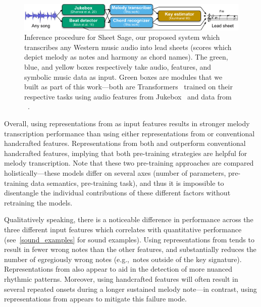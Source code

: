 \begin{figure}
    \centering
    \includegraphics[width=\linewidth]{figs/sheetsage.pdf}
    \caption{
    Inference procedure for Sheet Sage, our proposed system which transcribes any Western music audio into lead sheets (scores which depict melody as notes and harmony as chord names). The green, blue, and yellow boxes respectively take audio, features, and symbolic music data as input. Green boxes are modules that we built as part of this work---both are Transformers~\cite{vaswani2017attention} trained on their respective tasks using audio features from Jukebox~\cite{dhariwal2020jukebox} and data from \hooktheory~\cite{hooktheory}.}
    \label{fig:sheet_sage}
\end{figure}

Overall, using representations from \jukebox{} as input features results in stronger melody transcription performance than using either representations from \mtthree{} or conventional handcrafted features. 
Representations from both \mtthree{} and \jukebox{} outperform conventional handcrafted features, 
implying that both pre-training strategies are helpful for melody transcription. 
Note that these two pre-training approaches are compared holistically---these models differ on several axes 
(number of parameters, 
pre-training data semantics, 
pre-training task), 
and thus it is impossible to disentangle the individual contributions of these different factors without retraining the models. 

Qualitatively speaking, there is a noticeable difference in performance across the three different input features which correlates with quantitative performance (see~\cref{sound_examples} for sound examples). 
Using representations from \jukebox{} tends to result in fewer wrong notes than the other features, and substantially reduces the number of egregiously wrong notes (e.g.,~notes outside of the key signature). 
Representations from \jukebox{} also appear to aid in the detection of more nuanced rhythmic patterns. 
Moreover, using handcrafted features will often result in several repeated onsets during a longer sustained melody note---in contrast, using representations from \jukebox{} appears to mitigate this failure mode.

